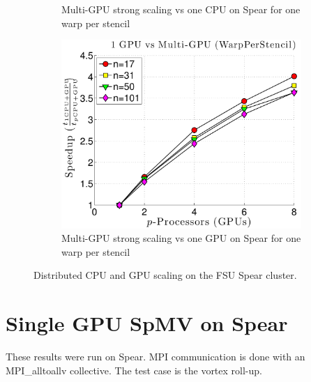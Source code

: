 \begin{figure}
\begin{subfigure}[t]{0.425\textwidth}
\caption{Multi-GPU strong scaling vs one CPU on Spear for one warp per stencil}
\label{fig:spear_alltoall_multigpu_vs_cpu_scaling}
\end{subfigure} 
\begin{subfigure}[t]{0.425\textwidth}
\centering
\includegraphics[width=1.0\textwidth]{../figures/spear_results/vortex/speedup_1GPU_vs_NGPU_WarpPerStencil-eps-converted-to.pdf}
\caption{Multi-GPU strong scaling vs one GPU on Spear for one warp per stencil}
\label{fig:spear_alltoall_multigpu_vs_gpu_scaling}
\end{subfigure} 
\caption{Distributed CPU and GPU scaling on the FSU Spear cluster.}
\end{figure} 




\section{Single GPU SpMV on Spear}

These results were run on Spear. MPI communication is done with an MPI\_alltoallv collective. The test case is the vortex roll-up. 

